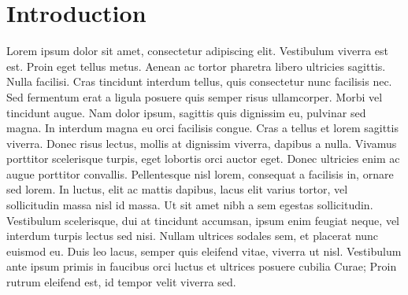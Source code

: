 \documentclass[graybox,natbib]{svmult}
\begin{document}


\section{Introduction}\label{introduction}

Lorem ipsum dolor sit amet, consectetur adipiscing elit. Vestibulum
viverra est est. Proin eget tellus metus. Aenean ac tortor pharetra
libero ultricies sagittis. Nulla facilisi. Cras tincidunt interdum
tellus, quis consectetur nunc facilisis nec. Sed fermentum erat a ligula
posuere quis semper risus ullamcorper. Morbi vel tincidunt augue. Nam
dolor ipsum, sagittis quis dignissim eu, pulvinar sed magna. In interdum
magna eu orci facilisis congue. Cras a tellus et lorem sagittis viverra.
Donec risus lectus, mollis at dignissim viverra, dapibus a nulla.
Vivamus porttitor scelerisque turpis, eget lobortis orci auctor eget.
Donec ultricies enim ac augue porttitor convallis. Pellentesque nisl
lorem, consequat a facilisis in, ornare sed lorem. In luctus, elit ac
mattis dapibus, lacus elit varius tortor, vel sollicitudin massa nisl id
massa. Ut sit amet nibh a sem egestas sollicitudin. Vestibulum
scelerisque, dui at tincidunt accumsan, ipsum enim feugiat neque, vel
interdum turpis lectus sed nisi. Nullam ultrices sodales sem, et
placerat nunc euismod eu. Duis leo lacus, semper quis eleifend vitae,
viverra ut nisl. Vestibulum ante ipsum primis in faucibus orci luctus et
ultrices posuere cubilia Curae; Proin rutrum eleifend est, id tempor
velit viverra sed.
\end{document}
